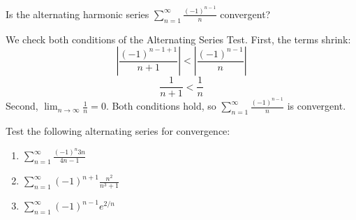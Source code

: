 \begin{Worked}
\begin{Problem}
Is the alternating harmonic series $\sum_{n=1}^\infty 
\frac{(-1)^{n-1}}{n}$ convergent?
\end{Problem}
\begin{Solution}
We check both conditions of the Alternating Series Test. First, the terms shrink:
$$\left| \frac{(-1)^{n-1+1}}{n+1} \right| < \left| \frac{(-1)^{n-1}}{n} \right|$$
$$\frac{1}{n+1} < \frac{1}{n}$$
Second, $\lim_{n \to \infty} \frac{1}{n} = 0$. Both conditions hold, so $\sum_{n=1}^\infty 
\frac{(-1)^{n-1}}{n}$ is convergent. 
\end{Solution}
\end{Worked}

\begin{Exercise}[label=alt1]
Test the following alternating series for convergence:
\begin{enumerate}
\item $\sum_{n=1}^\infty \frac{(-1)^n 3n}{4n-1}$
\item $\sum_{n=1}^\infty (-1)^{n+1} \frac{n^2}{n^3 + 1}$
\item $\sum_{n=1}^\infty (-1)^{n-1} e^{2/n}$
\end{enumerate}
\vspace{50mm}
\end{Exercise}


